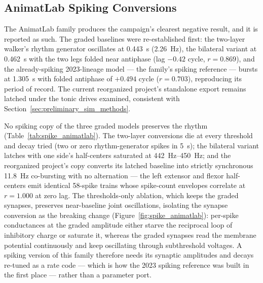 \subsection{AnimatLab Spiking Conversions}

The AnimatLab family produces the campaign's clearest negative result, and it is reported as such. The graded baselines were re-established first: the two-layer walker's rhythm generator oscillates at \qty{0.443}{\second} (\qty{2.26}{\hertz}), the bilateral variant at \qty{0.462}{\second} with the two legs folded near antiphase (lag $-0.42$ cycle, $r = 0.869$), and the already-spiking 2023-lineage model --- the family's spiking reference --- bursts at \qty{1.305}{\second} with folded antiphase of $+0.494$ cycle ($r = 0.703$), reproducing its period of record. The current reorganized project's standalone export remains latched under the tonic drives examined, consistent with Section~\ref{sec:preliminary_sim_methods}.

No spiking copy of the three graded models preserves the rhythm (Table~\ref{tab:spike_animatlab}). The two-layer conversions die at every threshold and decay tried (two or zero rhythm-generator spikes in \qty{5}{\second}); the bilateral variant latches with one side's half-centers saturated at \qty{442}{\hertz}--\qty{450}{\hertz}; and the reorganized project's copy converts its latched baseline into strictly synchronous \qty{11.8}{\hertz} co-bursting with no alternation --- the left extensor and flexor half-centers emit identical 58-spike trains whose spike-count envelopes correlate at $r = 1.000$ at zero lag. The thresholds-only ablation, which keeps the graded synapses, preserves near-baseline joint oscillations, isolating the synapse conversion as the breaking change (Figure~\ref{fig:spike_animatlab}): per-spike conductances at the graded amplitude either starve the reciprocal loop of inhibitory charge or saturate it, whereas the graded synapses read the membrane potential continuously and keep oscillating through subthreshold voltages. A spiking version of this family therefore needs its synaptic amplitudes and decays re-tuned as a rate code --- which is how the 2023 spiking reference was built in the first place --- rather than a parameter port.

